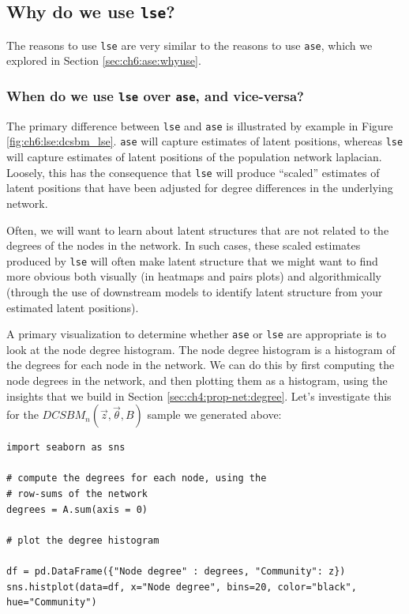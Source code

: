 \subsection{Why do we use \texttt{lse}?}

The reasons to use \texttt{lse} are very similar to the reasons to use \texttt{ase}, which we explored in Section \ref{sec:ch6:ase:whyuse}. 

\subsubsection{When do we use \texttt{lse} over \texttt{ase}, and vice-versa?}

The primary difference between \texttt{lse} and \texttt{ase} is illustrated by example in Figure \ref{fig:ch6:lse:dcsbm_lse}. \texttt{ase} will capture estimates of latent positions, whereas \texttt{lse} will capture estimates of latent positions of the population network laplacian. Loosely, this has the consequence that \texttt{lse} will produce ``scaled'' estimates of latent positions that have been adjusted for degree differences in the underlying network. 

Often, we will want to learn about latent structures that are not related to the degrees of the nodes in the network. In such cases, these scaled estimates produced by \texttt{lse} will often make latent structure that we might want to find more obvious both visually (in heatmaps and pairs plots) and algorithmically (through the use of downstream models to identify latent structure from your estimated latent positions). 

A primary visualization to determine whether \texttt{ase} or \texttt{lse} are appropriate is to look at the {node degree histogram}. The node degree histogram is a histogram of the degrees for each node in the network. We can do this by first computing the node degrees in the network, and then plotting them as a histogram, using the insights that we build in Section \ref{sec:ch4:prop-net:degree}. Let's investigate this for the $DCSBM_n(\vec z, \vec \theta, B)$ sample we generated above:

\begin{lstlisting}[style=python]
import seaborn as sns

# compute the degrees for each node, using the
# row-sums of the network
degrees = A.sum(axis = 0)

# plot the degree histogram

df = pd.DataFrame({"Node degree" : degrees, "Community": z})
sns.histplot(data=df, x="Node degree", bins=20, color="black", hue="Community")
\end{lstlisting}

